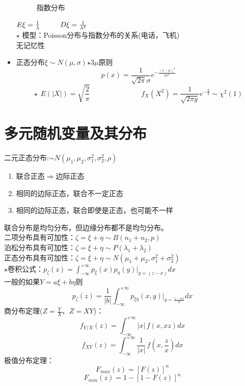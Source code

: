 \documentclass{article}
\begin{document}
\begin{itemize}
\begin{figure}[H]
\begin{center}
        \caption{指数分布}
    \end{center}
\end{figure}
$E\xi =\frac{1}{\lambda} \hspace*{1cm} D\xi =\frac{1}{\lambda ^2}$\\
{\color{red}$\star$ 模型：Poisson分布与指数分布的关系(电话，飞机)\\无记忆性}
    \item 正态分布\hspace*{0.5cm}$\xi\sim N(\mu,\sigma )$\hspace*{1cm}$\star$3$\mu$原则
    \[p(x)= \frac{1}{\sqrt{2\pi}\sigma}e^{-\frac{{(x-\mu)}^2}{2\sigma^2}} \]
    {\color{red}\[\star \hspace{5pt}E(|X|)=\sqrt{\frac{2}{\pi}}\hspace{3cm}f_X(X^2)=\frac{1}{\sqrt{2\pi y}}e^{-\frac{y}{2}} \sim \chi ^2(1)\]}
\end{itemize}
\clearpage


\section*{\center\Huge 多元随机变量及其分布}

\noindent 二元正态分布:\hspace*{0.5cm}$\sim N(\mu_1,\mu_2,\sigma_1^2,\sigma_2^2,\rho)$
    \begin{enumerate}
        \item 联合正态$\Longrightarrow$边际正态
        \item 相同的边际正态，联合不一定正态
        \item 相同的边际正态，联合即使是正态，也可能不一样
    \end{enumerate}
    联合分布是均匀分布，但边缘分布都不是均匀分布。\\
    二项分布具有可加性：$\zeta =\xi +\eta \sim B(n_1+n_2,p)$\\
    泊松分布具有可加性：$\zeta =\xi +\eta \sim P(\lambda_1+\lambda_2)$\\
    正态分布具有可加性：$\zeta =\xi +\eta \sim N(\mu_1+\mu_2,\sigma_1^2+\sigma_2^2)$\\
    $\star$卷积公式：$p_\zeta(z)=\int_{-\infty}^{+\infty}p_\xi(x)p_\eta(y)|_{y=(z-x)}dx$\\
    一般的如果$Y =a\xi +b\eta $则
    \[p_{\zeta}(z)=\frac{1}{|b|}\int_{-\infty}^{+\infty}p_{\xi \eta}(x,y)|_{y=\frac{z-ax}{b}}dx\]
    商分布定理($Z=\frac{Y}{X}$、$Z=XY$)：
    \[f_{Y/X}(z)=\int_{-\infty}^{+\infty}|x|\hspace{2pt}f(x,xz)dx\]
    \[f_{XY}(z)=\int_{-\infty}^{+\infty}\frac{1}{|x|}\hspace{2pt}f(x,\frac{z}{x})dx\]
    极值分布定理：
    \[F_{max}(z)={[F(z)]}^n\]
    \[F_{min}(z)=1-{[1-F(z)]}^n\]
\end{document}
